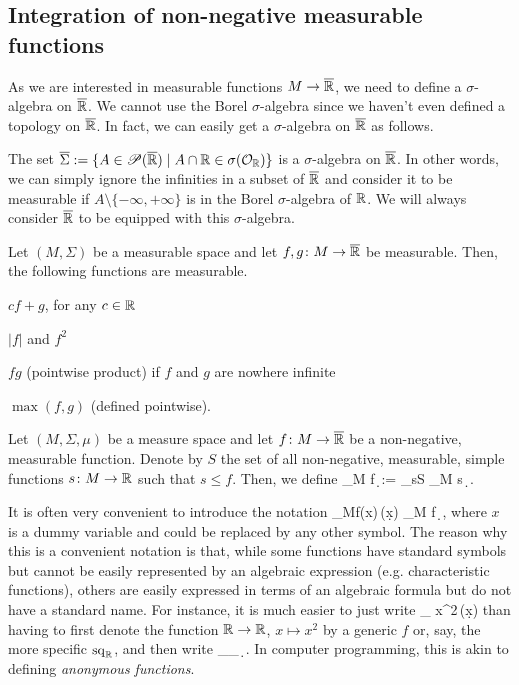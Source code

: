\subsection{Integration of non-negative measurable functions}

As we are interested in measurable functions $M\to\overline{\mathbb{R}}$, we need to define a $\sigma$-algebra on $\overline{\mathbb{R}}$. We cannot use the Borel $\sigma$-algebra since we haven't even defined a topology on $\overline{\mathbb{R}}$. In fact, we can easily get a $\sigma$-algebra on $\overline{\mathbb{R}}$ as follows.

\bp
The set $\overline{\Sigma}:=\{A\in \mathscr{P}(\overline{\mathbb{R}})\mid A\cap \mathbb{R} \in \sigma(\mathcal{O}_{\mathbb{R}})\}$ is a $\sigma$-algebra on $\overline{\mathbb{R}}$.
\ep
In other words, we can simply ignore the infinities in a subset of $\overline{\mathbb{R}}$ and consider it to be measurable if $A\setminus\{-\infty,+\infty\}$ is in the Borel $\sigma$-algebra of $\mathbb{R}$. We will always consider $\overline{\mathbb{R}}$ to be equipped with this $\sigma$-algebra.

\bl
\label{lem:measurable}
Let $(M,\Sigma)$ be a measurable space and let $f,g\colon M\to \overline{\mathbb{R}}$ be measurable. Then, the following functions are measurable.
\ben[label=(\roman*)]
\item $cf+g$, for any $c\in \mathbb{R}$
\item $|f|$ and $f^2$
\item $fg$ (pointwise product) if $f$ and $g$ are nowhere infinite
\item $\max(f,g)$ (defined pointwise).
\een
\el


\bd
Let $(M,\Sigma,\mu)$ be a measure space and let $f\colon M\to\overline{\mathbb{R}}$ be a non-negative, measurable function. Denote by $S$ the set of all non-negative, measurable, simple functions $s\colon M \to \mathbb{R}$ such that $s\leq f$. Then, we define
\bse
\int_M\! f\, \d \mu := \sup_{s\in S} \int_M\! s\, \d \mu.
\ese
\ed

\br
It is often very convenient to introduce the notation
\bse
\int_M\!f(x)\,\mu(\d x) \equiv \int_M\! f\, \d \mu,
\ese
where $x$ is a dummy variable and could be replaced by any other symbol. The reason why this is a convenient notation is that, while some functions have standard symbols but cannot be easily represented by an algebraic expression (e.g. characteristic functions), others are easily expressed in terms of an algebraic formula but do not have a standard name. For instance, it is much easier to just write
\bse
\int_{\R}  x^2\,\mu(\d x)
\ese
than having to first denote the function $\mathbb{R}\to\mathbb{R}$, $x\mapsto x^2$ by a generic $f$ or, say, the more specific $\mathrm{sq}_{\mathbb{R}}$, and then write 
\bse
\int_\R{}_{\R}\, \d \mu.
\ese
In computer programming, this is akin to defining \emph{anonymous functions}.
\er

